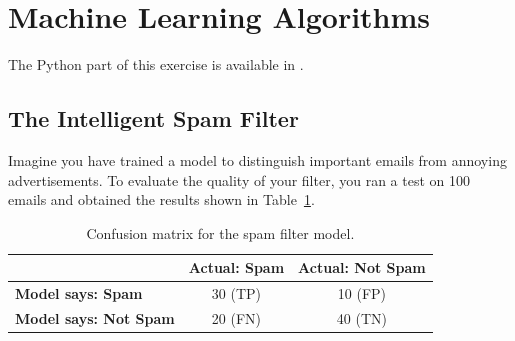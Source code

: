\section{Machine Learning Algorithms}

The Python part of this exercise is available in .

\subsection*{The Intelligent Spam Filter}

Imagine you have trained a model to distinguish important emails from annoying advertisements. To evaluate the quality of your filter, you ran a test on 100 emails and obtained the results shown in Table~\ref{tab:confusion-matrix-ejs}.
\begin{table}
    \centering
    \caption{Confusion matrix for the spam filter model.}
    \begin{tabular}{l||c|c}
        & \textbf{Actual: Spam} & \textbf{Actual: Not Spam} \\
        \hline \hline
        \textbf{Model says: Spam} & 30 (TP) & 10 (FP) \\
        \textbf{Model says: Not Spam} & 20 (FN) & 40 (TN) \\
    \end{tabular}
    \label{tab:confusion-matrix-ejs}
\end{table}

